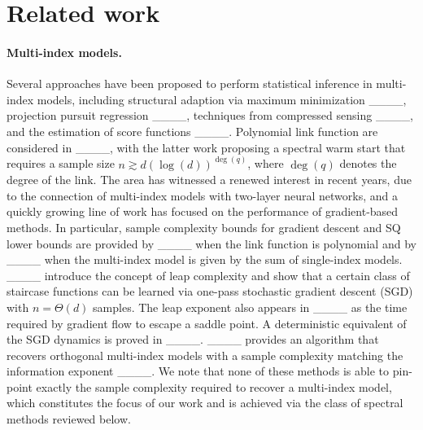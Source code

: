 \section{Related work}
\label{sec:related}


\paragraph{Multi-index models.}
Several approaches have been proposed to perform statistical inference in multi-index models, including 
structural adaption via maximum minimization ____, 
projection pursuit regression ____,
techniques from compressed sensing 
____, and the estimation of score functions
____. 
Polynomial link function are considered in ____, with the latter work proposing a spectral warm start that requires a sample size $ n \gtrsim d (\log(d))^{\deg(q)} $, where $\deg(q)$ denotes the degree of the link. The area has witnessed a renewed interest in recent years, due to the connection of multi-index models with two-layer neural networks, and a quickly growing line of work has focused on the performance of gradient-based methods. In particular, sample complexity bounds for gradient descent and SQ lower bounds are provided by ____ when the link function is polynomial and by  ____ when the multi-index model is given by the sum of single-index models. 
____ introduce the concept of leap complexity and show that a certain class of staircase functions can be learned via one-pass stochastic gradient descent (SGD) with $n = \Theta(d)$ samples. The leap exponent also appears in ____ as the time required by gradient flow to escape a saddle point. 
A deterministic equivalent of the SGD dynamics is proved in ____.  
____ provides an algorithm that recovers orthogonal multi-index models with a sample complexity matching the information exponent 
____. 
We note that none of these methods is able to pin-point exactly the sample complexity required to recover a multi-index model, which constitutes the focus of our work and is achieved via the class of spectral methods reviewed below.


